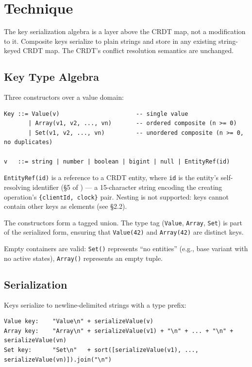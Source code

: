 \section{Technique}

The key serialization algebra is a layer above the CRDT map, not a modification to it. Composite keys serialize to plain strings and store in any existing string-keyed CRDT map. The CRDT's conflict resolution semantics are unchanged.

\subsection{Key Type Algebra}

Three constructors over a value domain:

\begin{lstlisting}
Key ::= Value(v)                      -- single value
       | Array(v1, v2, ..., vn)       -- ordered composite (n >= 0)
       | Set(v1, v2, ..., vn)         -- unordered composite (n >= 0, no duplicates)

v   ::= string | number | boolean | bigint | null | EntityRef(id)
\end{lstlisting}

\texttt{EntityRef(id)} is a reference to a CRDT entity, where \texttt{id} is the entity's self-resolving identifier (\S 5 of \cite{plexus:arch}) --- a 15-character string encoding the creating operation's \texttt{\{clientId, clock\}} pair. Nesting is not supported: keys cannot contain other keys as elements (see \S 2.2).

The constructors form a tagged union. The type tag (\texttt{Value}, \texttt{Array}, \texttt{Set}) is part of the serialized form, ensuring that \texttt{Value(42)} and \texttt{Array(42)} are distinct keys.

Empty containers are valid: \texttt{Set()} represents ``no entities'' (e.g., base variant with no active states), \texttt{Array()} represents an empty tuple.

\subsection{Serialization}

Keys serialize to newline-delimited strings with a type prefix:

\begin{lstlisting}
Value key:    "Value\n" + serializeValue(v)
Array key:    "Array\n" + serializeValue(v1) + "\n" + ... + "\n" + serializeValue(vn)
Set key:      "Set\n"   + sort([serializeValue(v1), ..., serializeValue(vn)]).join("\n")
\end{lstlisting}

